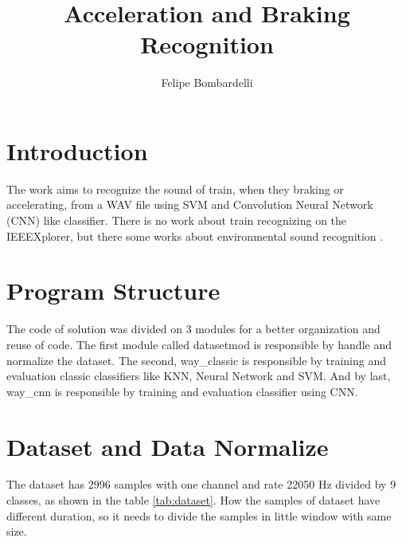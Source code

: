 \documentclass[12pt,oneside,a4paper]{article}
\title{Acceleration and Braking Recognition}
\author{Felipe Bombardelli}
\begin{document}
\maketitle

\section{Introduction}

The work aims to recognize the sound of train, when they braking or accelerating, from a WAV file using SVM and Convolution Neural Network (CNN) like classifier. There is no work about train recognizing on the IEEEXplorer, but there some works about environmental sound recognition \cite{chachada-survey}\cite{huzaifah-features}\cite{piczak}.



\section{Program Structure}

The code of solution was divided on 3 modules for a better organization and reuse of code. The first module called datasetmod is responsible by handle and normalize the dataset. The second, way\_classic is responsible by training and evaluation classic classifiers like KNN, Neural Network and SVM. And by last, way\_cnn is responsible by training and evaluation  classifier using CNN.


\section{Dataset and Data Normalize}

The dataset has 2996 samples with one channel and rate 22050 Hz divided by 9 classes, as shown in the table \ref{tab:dataset}.
How the samples of dataset have different duration, so it needs to divide the samples in little window with same size.
\end{document}
